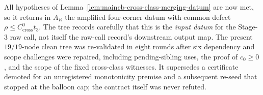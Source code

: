 All hypotheses of Lemma~\ref{lem:maincb-cross-class-merging-datum} are now met, so it
returns in $A_R$ the amplified four-corner datum with common defect
$\rho\le C_{\mathrm{cross}}^{0}t_{3}$.  The tree records carefully that this is the
\emph{input datum} for the Stage-3 raw call, not itself the raw-call record's downstream
output map.  The present $19/19$-node clean tree was re-validated in eight rounds after six
dependency and scope challenges were repaired, including pending-sibling uses, the proof of
$c_{0}\ge0$, and the scope of the fixed cross-class witnesses.  It supersedes a certificate
demoted for an unregistered monotonicity premise and a subsequent re-seed that stopped at
the balloon cap; the contract itself was never refuted.
